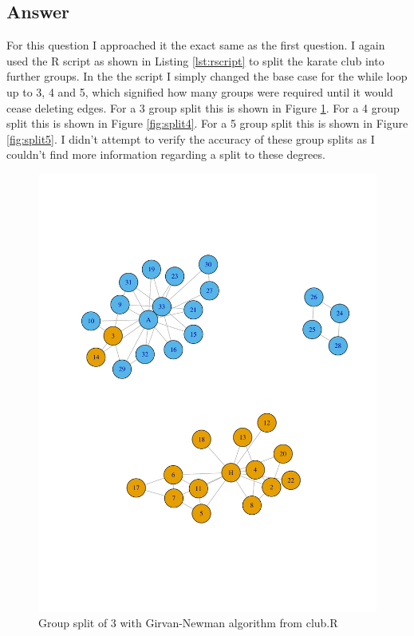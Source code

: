 \documentclass[letterpaper,11pt]{article}
\begin{document}
\clearpage
\subsection*{Answer}

For this question I approached it the exact same as the first question. I again used the R script as shown in Listing \ref{lst:rscript} to split the karate club into further groups. In the the script I simply changed the base case for the while loop up to 3, 4 and 5, which signified how many groups were required until it would cease deleting edges. For a 3 group split this is shown in Figure \ref{fig:split3}. For a 4 group split this is shown in Figure \ref{fig:split4}. For a 5 group split this is shown in Figure \ref{fig:split5}. I didn't attempt to verify the accuracy of these group splits as I couldn't find more information regarding a split to these degrees.

\begin{figure}[h]
\centering
\includegraphics[scale=0.6]{predictedSplit3.pdf}
\caption{Group split of 3 with Girvan-Newman algorithm from club.R}
\label{fig:split3}
\end{figure}
\end{document}
